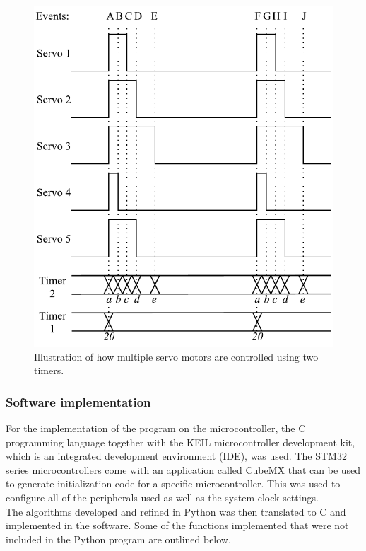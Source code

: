 \begin{figure}[H]
\centering
\includegraphics[scale = 1]{pics/Servo2.pdf}
\caption{Illustration of how multiple servo motors are controlled using two timers.}
\label{fig:Servo2}
\end{figure}

\subsubsection{Software implementation}
For the implementation of the program on the microcontroller, the C programming language together with the KEIL microcontroller development kit, which is an integrated development environment (IDE), was used. The STM32 series microcontrollers come with an application called CubeMX that can be used to generate initialization code for a specific microcontroller. This was used to configure all of the peripherals used as well as the system clock settings.\\

The algorithms developed and refined in Python was then translated to C and implemented in the software. Some of the functions implemented that were not included in the Python program are outlined below.\\


